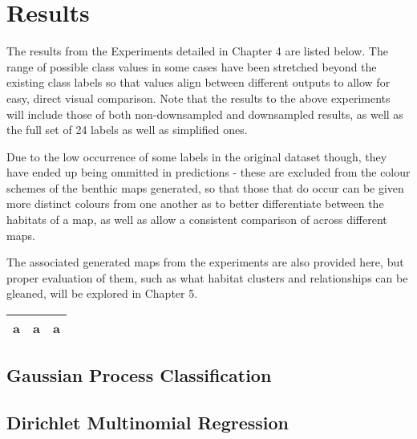 \chapter{Results} \label{chap:results}

The results from the Experiments detailed in Chapter 4 are listed below. The range of possible class values in some cases have been stretched beyond the existing class labels so that values align between different outputs to allow for easy, direct visual comparison. Note that the results to the above experiments will include those of both non-downsampled and downsampled results, as well as the full set of 24 labels as well as simplified ones.

Due to the low occurrence of some labels in the original dataset though, they have ended up being ommitted in predictions - these are excluded from the colour schemes of the benthic maps generated, so that those that do occur can be given more distinct colours from one another as to better differentiate between the habitats of a map, as well as allow a consistent comparison of across different maps.

The associated generated maps from the experiments are also provided here, but proper evaluation of them, such as what habitat clusters and relationships can be gleaned, will be explored in Chapter 5. 

\begin{tabular}{|c|c|c|}
    \hline
    a & a & a \\
    \hline
\end{tabular}

\section{Gaussian Process Classification}

\section{Dirichlet Multinomial Regression}


